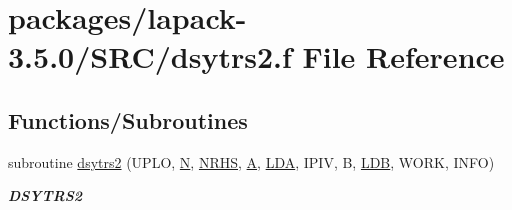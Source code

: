 \hypertarget{dsytrs2_8f}{}\section{packages/lapack-\/3.5.0/\+S\+R\+C/dsytrs2.f File Reference}
\label{dsytrs2_8f}
\subsection*{Functions/\+Subroutines}
\begin{DoxyCompactItemize}
\item 
subroutine \hyperlink{group__doubleSYcomputational_gab0c59205c9495599bec9eaa9df965655}{dsytrs2} (U\+P\+L\+O, \hyperlink{polmisc_8c_a0240ac851181b84ac374872dc5434ee4}{N}, \hyperlink{example__user_8c_aa0138da002ce2a90360df2f521eb3198}{N\+R\+H\+S}, \hyperlink{classA}{A}, \hyperlink{example__user_8c_ae946da542ce0db94dced19b2ecefd1aa}{L\+D\+A}, I\+P\+I\+V, B, \hyperlink{example__user_8c_a50e90a7104df172b5a89a06c47fcca04}{L\+D\+B}, W\+O\+R\+K, I\+N\+F\+O)
\begin{DoxyCompactList}\small\item\em {\bfseries D\+S\+Y\+T\+R\+S2} \end{DoxyCompactList}\end{DoxyCompactItemize}

